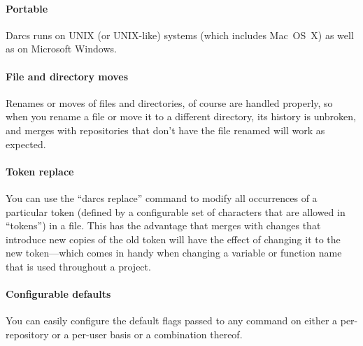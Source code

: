 \paragraph{Portable}
Darcs runs on UNIX (or UNIX-like) systems (which includes Mac~OS~X) as well
as on Microsoft Windows.

\paragraph{File and directory moves}
Renames or moves of files and directories, of course are handled properly,
so when you rename a file or move it to a different directory, its history
is unbroken, and merges with repositories that don't have the file renamed
will work as expected.

\paragraph{Token replace}
You can use the ``darcs replace'' command to modify all occurrences of a
particular token (defined by a configurable set of characters that are
allowed in ``tokens'') in a file.  This has the advantage that merges with
changes that introduce new copies of the old token will have the effect of
changing it to the new token---which comes in handy when changing a
variable or function name that is used throughout a project.

\paragraph{Configurable defaults}
You can easily configure the default flags passed to any command on either
a per-repository or a per-user basis or a combination thereof.

